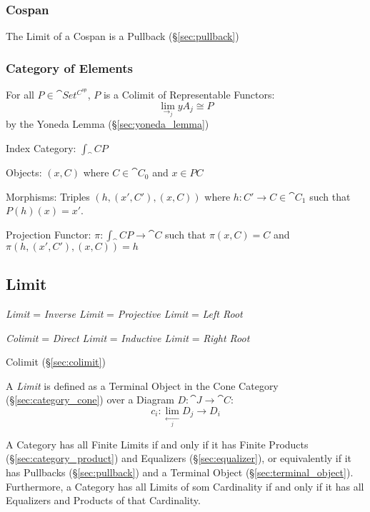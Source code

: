 \subsubsection{Cospan}\label{sec:cospan}

The Limit of a Cospan is a Pullback (\S\ref{sec:pullback})



\subsubsection{Category of Elements}\label{sec:element_category}

For all $P \in \cat{Set^{C^{op}}}$, $P$ is a Colimit of
Representable Functors:
\[
  \lim_{\rightarrow_j} yA_j \cong P
\]
by the Yoneda Lemma (\S\ref{sec:yoneda_lemma})

Index Category: $\int_\cat{C} P$

Objects: $(x,C)$ where $C \in \cat{C}_0$ and $x \in PC$

Morphisms: Triples $(h, (x',C'), (x,C))$ where $h : C' \rightarrow C
\in \cat{C}_1$ such that $P(h)(x) = x'$.

Projection Functor: $\pi : \int_\cat{C} P \rightarrow \cat{C}$
such that $\pi(x,C) = C$ and $\pi(h, (x',C'), (x,C)) = h$



\subsection{Limit}\label{sec:limit}

\emph{Limit} = \emph{Inverse Limit} = \emph{Projective Limit} =
\emph{Left Root}

\emph{Colimit} = \emph{Direct Limit} = \emph{Inductive Limit} =
\emph{Right Root}

Colimit (\S\ref{sec:colimit})

A \emph{Limit} is defined as a Terminal Object in the Cone Category
(\S\ref{sec:category_cone}) over a Diagram $D : \cat{J} \rightarrow
\cat{C}$:
\[
  c_i : \lim_{\xleftarrow[j]{}} D_j \rightarrow D_i
\]

A Category has all Finite Limits if and only if it has Finite Products
(\S\ref{sec:category_product}) and Equalizers (\S\ref{sec:equalizer}),
or equivalently if it has Pullbacks (\S\ref{sec:pullback}) and a
Terminal Object (\S\ref{sec:terminal_object}). Furthermore, a Category
has all Limits of som Cardinality if and only if it has all Equalizers
and Products of that Cardinality. \cite{awodey06}

